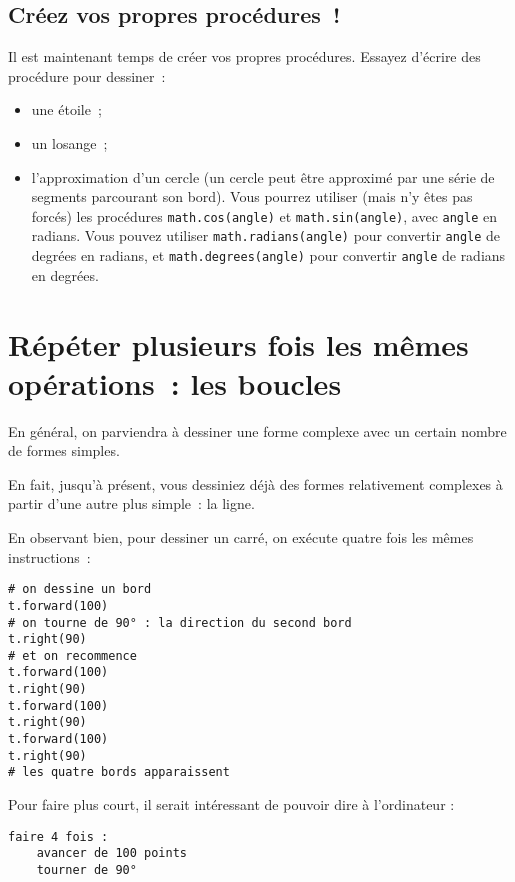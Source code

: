 \documentclass[11pt,a4paper]{article}
\begin{document}
\subsection{Créez vos propres procédures~!}

Il est maintenant temps de créer vos propres procédures. Essayez d'écrire des
procédure pour dessiner~:

\begin{itemize}
    \item une étoile~;
    \item un losange~;
    \item l'approximation d'un cercle (un cercle peut être approximé par une
        série de segments parcourant son bord). Vous pourrez utiliser (mais n'y
        êtes pas forcés) les procédures \lstinline{math.cos(angle)} et
        \lstinline{math.sin(angle)}, avec \lstinline{angle} en radians. 
        Vous pouvez utiliser \newline{}
        \lstinline{math.radians(angle)} pour convertir \lstinline{angle} de degrées en radians,
        et \lstinline{math.degrees(angle)} pour convertir \lstinline{angle} de radians en degrées.
\end{itemize}

\section{Répéter plusieurs fois les mêmes opérations~: les boucles}

En général, on parviendra à dessiner une forme complexe avec un certain nombre
de formes simples.

En fait, jusqu'à présent, vous dessiniez déjà des formes relativement complexes
à partir d'une autre plus simple~: la ligne.

En observant bien, pour dessiner un carré, on exécute quatre fois les mêmes
instructions~:

\begin{lstlisting}
# on dessine un bord
t.forward(100)
# on tourne de 90° : la direction du second bord
t.right(90)
# et on recommence
t.forward(100)
t.right(90)
t.forward(100)
t.right(90)
t.forward(100)
t.right(90)
# les quatre bords apparaissent
\end{lstlisting}

Pour faire plus court, il serait intéressant de pouvoir dire à
l'ordinateur :

\begin{lstlisting}
faire 4 fois :
    avancer de 100 points
    tourner de 90°
\end{lstlisting}
\end{document}
